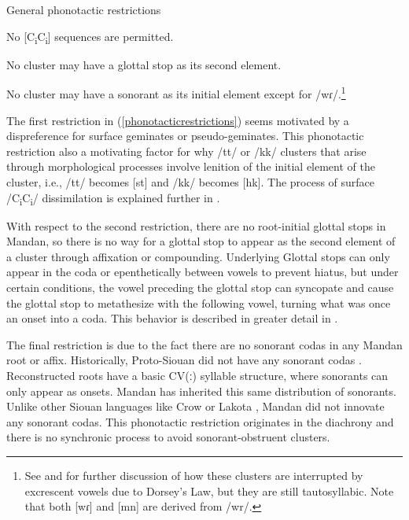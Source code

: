 \begin{exe}

\item\label{phonotacticrestrictions} General phonotactic restrictions

\begin{xlist}

\item No [C\textsubscript{i}C\textsubscript{i}] sequences are permitted.

\item No cluster may have a glottal stop as its second element.

\item No cluster may have a sonorant as its initial element except for /wɾ/.\footnote{See  and  for further discussion of how these clusters are interrupted by excrescent vowels due to Dorsey's Law, but they are still tautosyllabic. Note that both [wɾ] and [mn] are derived from /wr/.}

\end{xlist}

\end{exe}

The first restriction in (\ref{phonotacticrestrictions}) seems motivated by a dispreference for surface geminates or pseudo-geminates. This phonotactic restriction also a motivating factor for why /tt/ or /kk/ clusters that arise through morphological processes involve lenition of the initial element of the cluster, i.e., /tt/ becomes [st] and /kk/ becomes [hk]. The process of surface /C\textsubscript{i}C\textsubscript{i}/ dissimilation is explained further in .

With respect to the second restriction, there are no root-initial glottal stops in Mandan, so there is no way for a glottal stop to appear as the second element of a cluster through affixation or compounding. Underlying Glottal stops can only appear in the coda or epenthetically between vowels to prevent hiatus, but under certain conditions, the vowel preceding the glottal stop can syncopate and cause the glottal stop to metathesize with the following vowel, turning what was once an onset into a coda. This behavior is described in greater detail in . %

The final restriction is due to the fact there are no sonorant codas in any Mandan root or affix. Historically, Proto-Siouan did not have any sonorant codas \citep{rankinetalnd}. Reconstructed roots have a basic CV(ː) syllable structure, where sonorants can only appear as onsets. Mandan has inherited this same distribution of sonorants. Unlike other Siouan languages like Crow \citep{graczyk2007} or Lakota \citep{ingham2003}, Mandan did not innovate any sonorant codas. This phonotactic restriction originates in the diachrony and there is no synchronic process to avoid sonorant-obstruent clusters.

